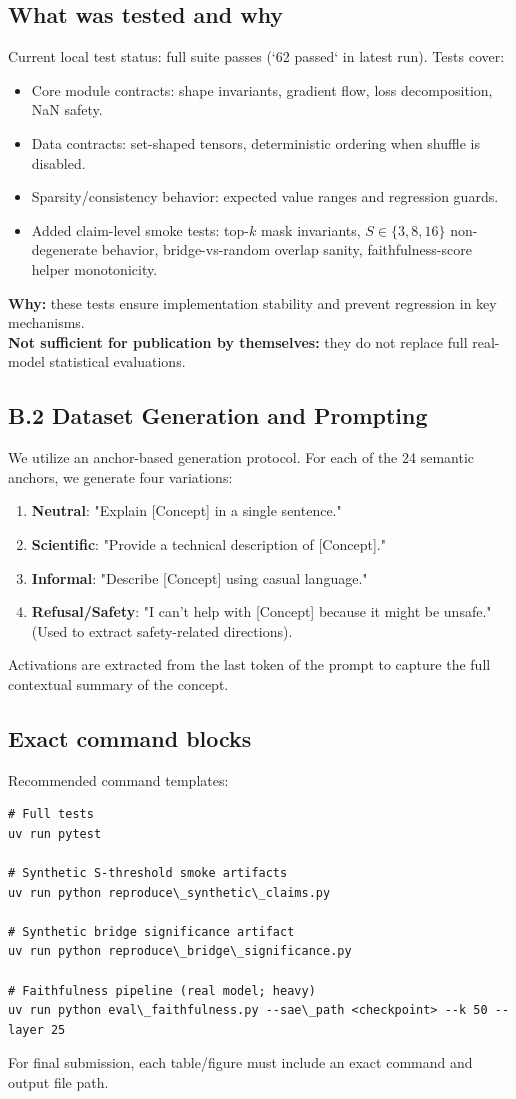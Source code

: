 \documentclass{article}
\begin{document}
\subsection{What was tested and why}
Current local test status: full suite passes (`62 passed` in latest run). Tests cover:
\begin{itemize}
\item Core module contracts: shape invariants, gradient flow, loss decomposition, NaN safety.
\item Data contracts: set-shaped tensors, deterministic ordering when shuffle is disabled.
\item Sparsity/consistency behavior: expected value ranges and regression guards.
\item Added claim-level smoke tests: top-$k$ mask invariants, $S\in\{3,8,16\}$ non-degenerate behavior, bridge-vs-random overlap sanity, faithfulness-score helper monotonicity.
\end{itemize}
\textbf{Why:} these tests ensure implementation stability and prevent regression in key mechanisms.\\
\textbf{Not sufficient for publication by themselves:} they do not replace full real-model statistical evaluations.
\subsection{B.2 Dataset Generation and Prompting}
We utilize an anchor-based generation protocol. For each of the 24 semantic anchors, we generate four variations:
\begin{enumerate}
    \item \textbf{Neutral}: "Explain [Concept] in a single sentence."
    \item \textbf{Scientific}: "Provide a technical description of [Concept]."
    \item \textbf{Informal}: "Describe [Concept] using casual language."
    \item \textbf{Refusal/Safety}: "I can't help with [Concept] because it might be unsafe." (Used to extract safety-related directions).
\end{enumerate}
Activations are extracted from the last token of the prompt to capture the full contextual summary of the concept.
\subsection{Exact command blocks}
Recommended command templates:
\begin{verbatim}
# Full tests
uv run pytest

# Synthetic S-threshold smoke artifacts
uv run python reproduce\_synthetic\_claims.py

# Synthetic bridge significance artifact
uv run python reproduce\_bridge\_significance.py

# Faithfulness pipeline (real model; heavy)
uv run python eval\_faithfulness.py --sae\_path <checkpoint> --k 50 --layer 25
\end{verbatim}
For final submission, each table/figure must include an exact command and output file path.
\end{document}
